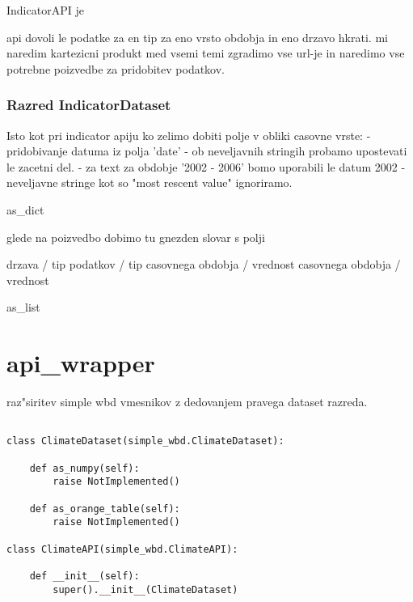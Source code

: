 IndicatorAPI je 


api dovoli le podatke za en tip za eno vrsto obdobja in eno drzavo hkrati.
mi naredim kartezicni produkt med vsemi temi zgradimo vse url-je in naredimo
vse potrebne poizvedbe za pridobitev podatkov.



\subsubsection{Razred IndicatorDataset}

Isto kot pri indicator apiju
ko zelimo dobiti polje v obliki casovne vrste:
 - pridobivanje datuma iz polja 'date'
   - ob neveljavnih stringih probamo upostevati le zacetni del.
     - za text za  obdobje  '2002 - 2006' bomo uporabili le datum 2002 
   - neveljavne stringe kot so "most rescent value" ignoriramo.




as\_dict 

glede na poizvedbo dobimo tu gnezden slovar s polji

drzava / tip podatkov / tip casovnega obdobja / vrednost casovnega obdobja / vrednost

as\_list

% 
% 



\section{api\_wrapper}



raz"siritev simple wbd vmesnikov z dedovanjem pravega dataset razreda.

\begin{verbatim}

class ClimateDataset(simple_wbd.ClimateDataset):
    
    def as_numpy(self):
        raise NotImplemented()
    
    def as_orange_table(self):
        raise NotImplemented()

class ClimateAPI(simple_wbd.ClimateAPI):

    def __init__(self):
        super().__init__(ClimateDataset)
\end{verbatim}


